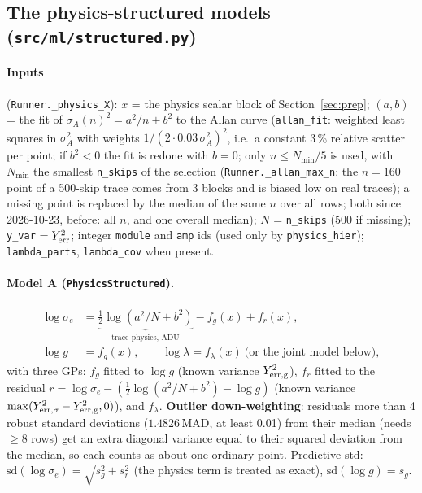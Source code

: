 \documentclass[10pt]{article}
\newcommand{\code}[1]{\texttt{#1}}
\newcommand{\se}{\sigma_e}
\begin{document}
\subsection{The physics-structured models (\code{src/ml/structured.py})}
\label{sec:physics}

\paragraph{Inputs} (\code{Runner.\_physics\_X}): $x$ = the physics scalar block of Section~\ref{sec:prep};
$(a, b)$ = the fit of $\sigma_A(n)^2 = a^2/n + b^2$ to the Allan curve (\code{allan\_fit}: weighted least squares in
$\sigma_A^2$ with weights $1/(2\cdot0.03\,\sigma_A^2)^2$, i.e.\ a constant 3\,\% relative scatter per point; if
$b^2 < 0$ the fit is redone with $b = 0$; only $n \le N_{\min}/5$ is used, with $N_{\min}$ the smallest \code{n\_skips}
of the selection (\code{Runner.\_allan\_max\_n}: the $n = 160$ point of a 500-skip trace comes from 3 blocks and is biased
low on real traces); a missing point is replaced by the median of the same $n$ over all rows; both since 2026-10-23,
before: all $n$, and one overall median); $N$ =
\code{n\_skips} (500 if missing); \code{y\_var} $= Y_{\rm err}^2$; integer \code{module} and \code{amp} ids (used only by
\code{physics\_hier}); \code{lambda\_parts}, \code{lambda\_cov} when present.

\paragraph{Model A (\code{PhysicsStructured}).}
\begin{align*}
\log\se &= \underbrace{\tfrac12\log\!\left(a^2/N + b^2\right)}_{\text{trace physics, ADU}} - f_g(x) + f_r(x),\\
\log g &= f_g(x), \qquad \log\lambda = f_\lambda(x)\ \text{(or the joint model below)},
\end{align*}
with three GPs: $f_g$ fitted to $\log g$ (known variance $Y_{\rm err,g}^2$), $f_r$ fitted to the residual
$r = \log\se - (\tfrac12\log(a^2/N + b^2) - \log g)$ (known variance $\max(Y_{\rm err,\sigma}^2 - Y_{\rm err,g}^2, 0)$),
and $f_\lambda$. \textbf{Outlier down-weighting}: residuals more than 4 robust standard deviations
($1.4826\,$MAD, at least 0.01) from their median (needs $\geq 8$ rows) get an extra diagonal variance equal to their
squared deviation from the median, so each counts as about one ordinary point. Predictive std:
$\mathrm{sd}(\log\se) = \sqrt{s_g^2 + s_r^2}$ (the physics term is treated as exact), $\mathrm{sd}(\log g) = s_g$.
\end{document}
